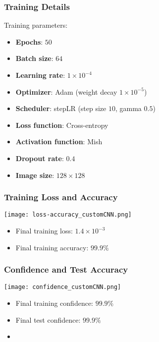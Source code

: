 \documentclass[../presentation.tex]{subfiles} %
\begin{document}
\begin{frame}
    
    \frametitle{Training Details}

    Training parameters:
    \vspace{0.2cm}
    \begin{itemize}
        \item \textbf{Epochs}: $50$
        \item \textbf{Batch size}: $64$
        \item \textbf{Learning rate}: $1\times10^{-4}$
        \item \textbf{Optimizer}: Adam (weight decay $1\times10^{-5}$)
        \item \textbf{Scheduler}: stepLR (step size $10$, gamma $0.5$)
        \item \textbf{Loss function}: Cross-entropy
        \item \textbf{Activation function}: Mish
        \item \textbf{Dropout rate}: $0.4$
        \item \textbf{Image size}: $128\times128$
    \end{itemize}

\end{frame}

\begin{frame}
    
    \frametitle{Training Loss and Accuracy}

    \begin{center}
        \texttt{[image: loss-accuracy\_customCNN.png]}
    \end{center}

    \small{
    \begin{cbox}
        \begin{itemize}
            \item Final training loss: $1.4\times10^{-3}$
            \item Final training accuracy: $99.9\%$
        \end{itemize}
    \end{cbox}
    }

\end{frame}

\begin{frame}
    
    \frametitle{Confidence and Test Accuracy}

    \begin{center}
        \texttt{[image: confidence\_customCNN.png]}
    \end{center}

    \small{
    \begin{cbox}
        \begin{itemize}
            \item Final training confidence: $99.9\%$
            \item Final test confidence: $99.9\%$
            \item {}
        \end{itemize}
    \end{cbox}
    }

\end{frame}
\end{document}
